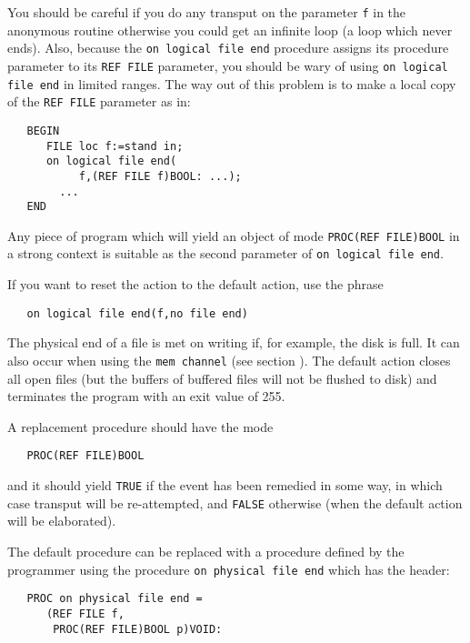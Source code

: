 You should be careful if you do any transput on the parameter
\verb|f| in the anonymous routine otherwise you could get an infinite
loop (a loop which never ends). Also, because the
\verb|on logical file end| procedure assigns its procedure parameter
to its \verb|REF FILE| parameter, you should be wary of using
\verb|on logical file end| in limited ranges. The way out of this
problem is to make a local copy of the \verb|REF FILE| parameter as
in:
\begin{verbatim}
   BEGIN
      FILE loc f:=stand in;
      on logical file end(
           f,(REF FILE f)BOOL: ...);
        ...
   END
\end{verbatim}

Any piece of program which will yield an object of mode
\verb|PROC(REF FILE)BOOL| in a strong context is suitable as the
second parameter of \verb|on logical file end|.

If you want to reset the action to the default action, use the phrase
\begin{verbatim}
   on logical file end(f,no file end)
\end{verbatim}

The physical end of a file is met on writing if, for example, the
disk is full. It can also occur when using the \verb|mem channel|
(see section ). The default action closes all
open files (but the buffers of buffered files will not be flushed to
disk) and terminates the program with an exit value of 255.

A replacement procedure should have the mode
\begin{verbatim}
   PROC(REF FILE)BOOL
\end{verbatim}
\noindent
and it should yield \verb|TRUE| if the event has been remedied in
some way, in which case transput will be re-attempted, and
\verb|FALSE| otherwise (when the default action will be elaborated).

The default procedure can be replaced with a procedure defined by the
programmer using the procedure \texttt{on physical file end} which has
the header:
\begin{verbatim}
   PROC on physical file end =
      (REF FILE f,
       PROC(REF FILE)BOOL p)VOID:
\end{verbatim}

